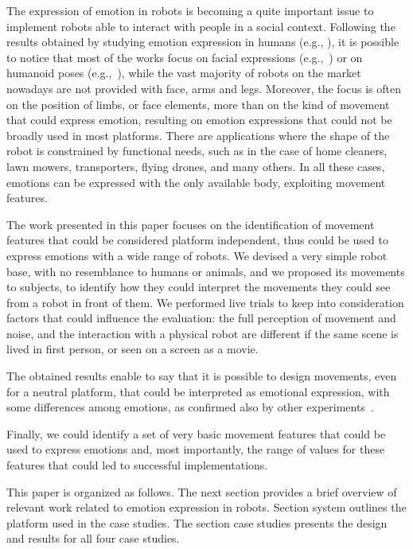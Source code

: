 The expression of emotion in robots is becoming a quite important issue to implement robots able to interact with people in a social context. Following the results obtained by studying emotion expression in humans (e.g., \cite{Venture2014,Ekman2004}), it is possible to notice that most of the works focus on facial expressions (e.g.,~\cite{Breazeal2002}) or on humanoid poses (e.g.,~\cite{Canamero2010}), while the vast majority of robots on the market nowadays are not provided with face, arms and legs. Moreover, the focus is often on the position of limbs, or face elements, more than on the kind of movement that could express emotion, resulting on emotion expressions that could not be broadly used in most platforms.
There are applications where the shape of the robot is constrained by functional needs, such as in the case of home cleaners, lawn mowers, transporters, flying drones, and many others. In all these cases, emotions can be expressed with the only available body, exploiting movement features.

The work presented in this paper focuses on the identification of movement features that could be considered platform independent, thus could be used to express emotions with a wide range of robots. We devised a very simple robot base, with no resemblance to humans or animals, and we proposed its movements to subjects, to identify how they could interpret the movements they could see from a robot in front of them. We performed live trials to keep into consideration factors that could influence the evaluation: the full perception of movement and noise, and the interaction with a physical robot are different if the same scene is lived in first person, or seen on a screen as a movie.

The obtained results enable to say that it is possible to design movements, even for a neutral platform, that could be interpreted as emotional expression, with some differences among emotions, as confirmed also by other experiments~\cite{Sharma2013}.

Finally, we could identify a set of very basic movement features that could be used to express emotions and, most importantly, the range of values for these features that could led to successful implementations.

This paper is organized as follows. The next section provides a brief overview of relevant work related to emotion expression in robots. Section system outlines the platform used in the case studies. The section case studies presents the design and results for all four case studies.